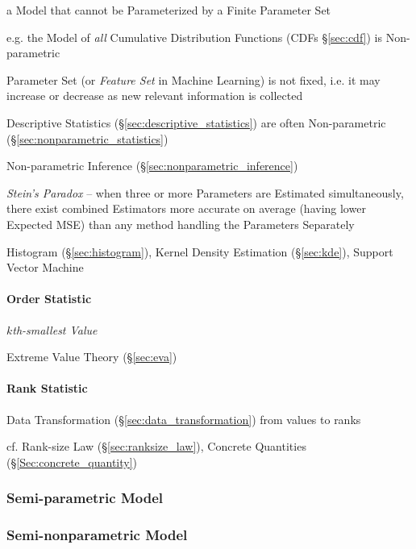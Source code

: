 a Model that cannot be Parameterized by a Finite Parameter Set

e.g. the Model of \emph{all} Cumulative Distribution Functions (CDFs
\S\ref{sec:cdf}) is Non-parametric

Parameter Set (or \emph{Feature Set} in Machine Learning) is not fixed, i.e. it
may increase or decrease as new relevant information is collected

Descriptive Statistics (\S\ref{sec:descriptive_statistics}) are often
Non-parametric (\S\ref{sec:nonparametric_statistics})

\fist Non-parametric Inference (\S\ref{sec:nonparametric_inference})

\emph{Stein's Paradox} -- when three or more Parameters are Estimated
simultaneously, there exist combined Estimators more accurate on average (having
lower Expected MSE) than any method handling the Parameters Separately

Histogram (\S\ref{sec:histogram}), Kernel Density Estimation (\S\ref{sec:kde}),
Support Vector Machine



\paragraph{Order Statistic}\label{sec:order_statistic}\hfill

\emph{$k$th-smallest Value}

Extreme Value Theory (\S\ref{sec:eva})



\paragraph{Rank Statistic}\label{sec:rank_statistic}\hfill

Data Transformation (\S\ref{sec:data_transformation}) from values to ranks

cf. Rank-size Law (\S\ref{sec:ranksize_law}), Concrete Quantities
(\S\ref{Sec:concrete_quantity})



\subsubsection{Semi-parametric Model}\label{sec:semiparametric_model}

\subsubsection{Semi-nonparametric Model}\label{sec:seminonparametric_model}

